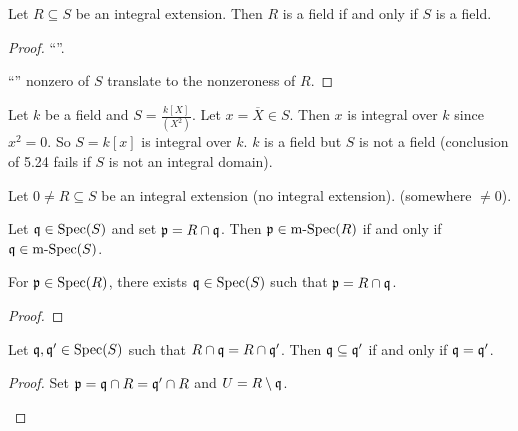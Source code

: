 \begin{proposition}
    Let $R \subseteq S$ be an integral extension. Then $R$ is a field if and only if $S$ is a field.
\end{proposition}

\begin{proof}
    ``''. \par 
    ``'' nonzero of $S$ translate to the nonzeroness of $R$.
\end{proof}

\begin{example}
    Let $k$ be a field and $S = \frac{k[X]}{(X^{2})}$. Let $x = \overbar{X} \in S$. Then $x$ is integral over $k$ since $x^{2} = 0$. So $S = k[x]$ is integral over $k$. $k$ is a field but $S$ is not a field (conclusion of 5.24 fails if $S$ is not an integral domain).
\end{example}

\noindent Let $0 \neq R \subseteq S$ be an integral extension (no integral extension). (somewhere $\neq 0$).

\begin{corollary}
    Let $\mathfrak{q} \in \operatorname{Spec}(S)$ and set $\mathfrak{p} = R \cap \mathfrak{q}$. Then $\mathfrak{p} \in \operatorname{m-Spec}(R)$ if and only if $\mathfrak{q} \in \operatorname{m-Spec}(S)$. 
\end{corollary}

\begin{theorem}
    For $\mathfrak{p} \in \operatorname{Spec}(R)$, there exists $\mathfrak{q} \in \operatorname{Spec}(S)$ such that $\mathfrak{p} = R \cap \mathfrak{q}$.
\end{theorem}

\begin{proof}
\end{proof}

\begin{proposition}
    Let $\mathfrak{q},\mathfrak{q}' \in \operatorname{Spec}(S)$ such that $R \cap \mathfrak{q} = R \cap \mathfrak{q}'$. Then $\mathfrak{q} \subseteq \mathfrak{q}'$ if and only if $\mathfrak{q} = \mathfrak{q}'$.
\end{proposition}

\begin{proof}
    Set $\mathfrak{p} = \mathfrak{q} \cap R = \mathfrak{q}' \cap R$ and $U = R \setminus \mathfrak{q}$. 
    \begin{center}
    \end{center}
\end{proof}

